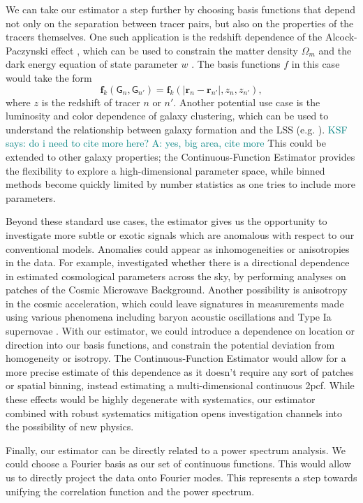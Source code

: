 \documentclass[modern]{aastex62}
\newcommand{\cf}{2pcf\xspace} %
\newcommand{\Est}{The Continuous-Function Estimator\xspace}
\newcommand{\est}{the Continuous-Function Estimator\xspace}
\newcommand{\bld}[1]{\bm{#1}} %
\newcommand{\ff}{\bld{f}}
\newcommand{\GG}[1]{\mathsf{G}_{#1}}
\newcommand{\KSF}[1]{\textcolor{teal}{KSF says: #1}}
\begin{document}
We can take our estimator a step further by choosing basis functions that depend not only on the separation between tracer pairs, but also on the properties of the tracers themselves.
One such application is the redshift dependence of the Alcock-Paczynski effect \citep{AlcockPaczynski1979}, which can be used to constrain the matter density $\Omega_m$ and the dark energy equation of state parameter $w$ \citep{Li2016}.
The basis functions $f$ in this case would take the form
\begin{equation}
    \ff_k(\GG{n}, \GG{n'}) = \ff_k(|\bld{r}_n - \bld{r}_{n'}|, z_n, z_{n'}),
\end{equation}
where $z$ is the redshift of tracer $n$ or $n'$.
Another potential use case is the luminosity and color dependence of galaxy clustering, which can be used to understand the relationship between galaxy formation and the LSS (e.g. \citealt{Zehavi2011}). \KSF{do i need to cite more here? A: yes, big area, cite more}
This could be extended to other galaxy properties; \est provides the flexibility to explore a high-dimensional parameter space, while binned methods become quickly limited by number statistics as one tries to include more parameters.

Beyond these standard use cases, the estimator gives us the opportunity to investigate more subtle or exotic signals which are anomalous with respect to our conventional models.
Anomalies could appear as inhomogeneities or anisotropies in the data.
For example, \cite{MukherjeeWandelt2018} investigated whether there is a directional dependence in estimated cosmological parameters across the sky, by performing analyses on patches of the Cosmic Microwave Background.
Another possibility is anisotropy in the cosmic acceleration, which could leave signatures in measurements made using various phenomena including baryon acoustic oscillations \citep{Faltenbacher2012} and Type Ia supernovae \citep{Colin2019}.
With our estimator, we could introduce a dependence on location or direction into our basis functions, and constrain the potential deviation from homogeneity or isotropy.
\Est would allow for a more precise estimate of this dependence as it doesn't require any sort of patches or spatial binning, instead estimating a multi-dimensional continuous \cf.
While these effects would be highly degenerate with systematics, our estimator combined with robust systematics mitigation opens investigation channels into the possibility of new physics.

Finally, our estimator can be directly related to a power spectrum analysis.
We could choose a Fourier basis as our set of continuous functions.
This would allow us to directly project the data onto Fourier modes.
This represents a step towards unifying the correlation function and the power spectrum.
\end{document}
